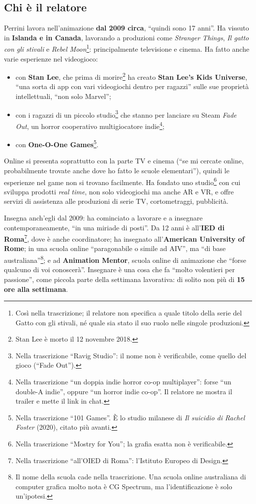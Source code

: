\subsection{Chi è il relatore}

Perrini lavora nell'animazione \textbf{dal 2009 circa}, ``quindi sono 17
anni''. Ha vissuto in \textbf{Islanda e in Canada}, lavorando a produzioni
come \emph{Stranger Things}, \emph{Il gatto con gli stivali} e \emph{Rebel
Moon}\footnote{Così nella trascrizione; il relatore non specifica a quale
titolo della serie del Gatto con gli stivali, né quale sia stato il suo
ruolo nelle singole produzioni.}: principalmente televisione e cinema. Ha
fatto anche varie esperienze nel videogioco:
\begin{itemize}
  \item con \textbf{Stan Lee}, che prima di morire\footnote{Stan Lee è morto
        il 12 novembre 2018.} ha creato \textbf{Stan Lee's Kids Universe},
        ``una sorta di app con vari videogiochi dentro per ragazzi'' sulle
        sue proprietà intellettuali, ``non solo Marvel'';
  \item con i ragazzi di un piccolo studio\footnote{Nella trascrizione
        ``Ravig Studio'': il nome non è verificabile, come quello del gioco
        (``Fade Out'').} che stanno per lanciare su Steam \emph{Fade Out},
        un horror cooperativo multigiocatore indie\footnote{Nella
        trascrizione ``un doppia indie horror co-op multiplayer'': forse
        ``un double-A indie'', oppure ``un horror indie co-op''. Il
        relatore ne mostra il trailer e mette il link in chat.};
  \item con \textbf{One-O-One Games}\footnote{Nella trascrizione ``101
        Games''. È lo studio milanese di \emph{Il suicidio di Rachel
        Foster} (2020), citato più avanti.}.
\end{itemize}
Online si presenta soprattutto con la parte TV e cinema (``se mi cercate
online, probabilmente trovate anche dove ho fatto le scuole elementari''),
quindi le esperienze nel game non si trovano facilmente. Ha fondato uno
studio\footnote{Nella trascrizione ``Mostry for You''; la grafia esatta non è
verificabile.} con cui sviluppa prodotti \emph{real time}, non solo
videogiochi ma anche AR e VR, e offre servizi di assistenza alle produzioni
di serie TV, cortometraggi, pubblicità.

Insegna anch'egli dal 2009: ha cominciato a lavorare e a insegnare
contemporaneamente, ``in una miriade di posti''. Da 12 anni è
all'\textbf{IED di Roma}\footnote{Nella trascrizione ``all'OIED di Roma'':
l'Istituto Europeo di Design.}, dove è anche coordinatore; ha insegnato
all'\textbf{American University of Rome}; in una scuola online ``paragonabile
o simile ad AIV'', ma ``di base australiana''\footnote{Il nome della scuola
cade nella trascrizione. Una scuola online australiana di computer grafica
molto nota è CG Spectrum, ma l'identificazione è solo un'ipotesi.}; e ad
\textbf{Animation Mentor}, scuola online di animazione che ``forse qualcuno
di voi conoscerà''. Insegnare è una cosa che fa ``molto volentieri per
passione'', come piccola parte della settimana lavorativa: di solito non più
di \textbf{15 ore alla settimana}.

